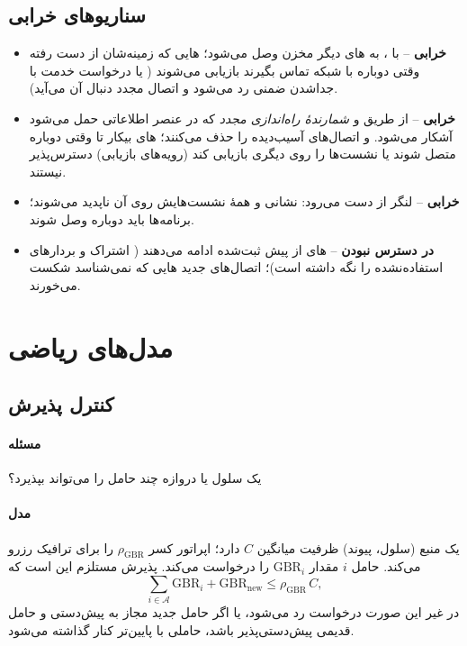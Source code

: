 \documentclass[11pt,a4paper]{article}
\begin{document}
\subsection{سناریوهای خرابی}
\begin{itemize}
  \item \textbf{خرابی } -- با ،  به های دیگر مخزن وصل می‌شود؛ هایی که
        زمینه‌شان از دست رفته وقتی دوباره با شبکه تماس بگیرند بازیابی می‌شوند ( یا درخواست خدمت با جداشدن
        ضمنی رد می‌شود و اتصال مجدد دنبال آن می‌آید).
  \item \textbf{خرابی } -- از طریق  و \emph{شمارندهٔ راه‌اندازی مجدد} که در عنصر اطلاعاتی
         حمل می‌شود آشکار می‌شود.  و  اتصال‌های  آسیب‌دیده را حذف می‌کنند؛
        های بیکار تا وقتی دوباره متصل شوند یا  نشست‌ها را روی  دیگری بازیابی کند (رویه‌های
        بازیابی) دسترس‌پذیر نیستند.
  \item \textbf{خرابی } -- لنگر  از دست می‌رود: نشانی   و همهٔ نشست‌هایش روی آن
         ناپدید می‌شوند؛ برنامه‌ها باید دوباره وصل شوند.
  \item \textbf{در دسترس نبودن } -- های از پیش ثبت‌شده ادامه می‌دهند ( اشتراک و بردارهای
        استفاده‌نشده را نگه داشته است)؛ اتصال‌های جدید هایی که  نمی‌شناسد شکست می‌خورند.
\end{itemize}

\section{مدل‌های ریاضی}

\subsection{کنترل پذیرش }\label{sec:admission}
\paragraph{مسئله} یک سلول یا دروازه چند حامل  را می‌تواند بپذیرد؟
\paragraph{مدل} یک منبع (سلول، پیوند) ظرفیت میانگین $C$ دارد؛ اپراتور کسر $\rho_{\mathrm{GBR}}$ را برای ترافیک
 رزرو می‌کند. حامل $i$ مقدار $\mathrm{GBR}_i$ را درخواست می‌کند. پذیرش مستلزم این است که
\begin{equation}\label{eq:adm}
  \sum_{i\in\mathcal{A}}\mathrm{GBR}_i + \mathrm{GBR}_{\mathrm{new}} \le \rho_{\mathrm{GBR}}\,C ,
\end{equation}
در غیر این صورت درخواست رد می‌شود، یا اگر حامل جدید مجاز به پیش‌دستی و حامل قدیمی پیش‌دستی‌پذیر باشد، حاملی با
 پایین‌تر کنار گذاشته می‌شود.
\end{document}
